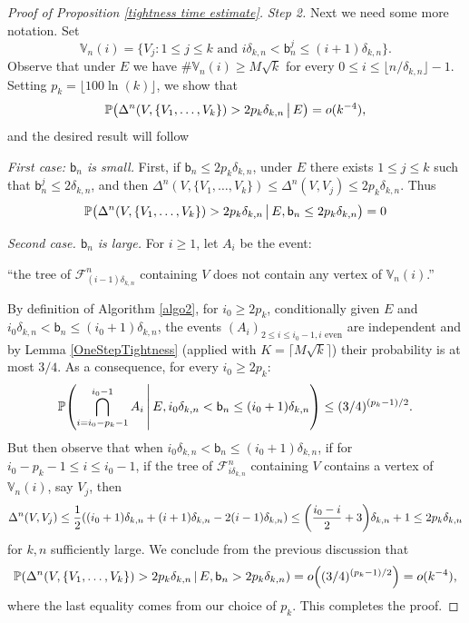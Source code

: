 \documentclass[11pt]{article}
\theoremstyle{plain}
\theoremstyle{definition}
\theoremstyle{remark}
\newcommand{\1}{\mathbbm{1}} %
\newcommand{\proba}[1]{\mathbb{P}\left(#1\right)} %
\newcommand{\F}{\mathcal{F}} %
\newcommand{\birth}{\mathsf{b}} %
\let\originalleft\left
\let\originalright\right
\renewcommand{\left}{\mathopen{}\mathclose\bgroup\originalleft}
\renewcommand{\right}{\aftergroup\egroup\originalright}
\begin{document}
\begin{proof}[Proof of Proposition \ref{tightness time estimate}]
\emph{Step 2.} Next we need some more notation. Set
\[
\mathbb{V}_{n}(i)= \{V_{j} : 1 \leq j \leq k \textrm{ and } i \delta_{k,n} {<} \birth_{n}^{j} {\leq} (i+1) \delta_{k,n} \}.
\]
Observe that under $E$ we have $\#\mathbb{V}_{n}(i) \geq M \sqrt{k}$ for every $0 \leq i \leq \lfloor n/ \delta_{k,n} \rfloor -1$.   Setting $p_{k}={\lfloor 100 \ln(k)\rfloor}$, we show that
\begin{equation}
\label{eq:tocheck}\proba{\Delta^n(V,\{V_1,\dots, V_{k}\})> 2p_{k} \delta_{k,n} \, \big |  \, E} = o(k^{-4}),
\end{equation}
and the desired result will follow

\emph{First case: $\birth_{n}$ is small.} First, if $\birth_{n} \leq 2p_{k}  \delta_{k,n}$, under $E$ there exists $1 \leq j \leq k$ such that $\birth^{j}_{n} \leq 2 \delta_{k,n}$, and then $\Delta^n(V,\{V_1,\dots, V_{k}\}) \leq \Delta^{n}(V,V_{j}) \leq 2 p_{k}\delta_{k,n}$. Thus
\[
\proba{\Delta^n(V,\{V_1,\dots, V_{k}\})> 2p_{k} \delta_{k,n} \, \big |  \, E, \birth_{n} \leq 2 p_{k} \delta_{k,n}} = 0
\]

 

\emph{Second case. $\birth_{n}$ is large.}  
For $i \geq 1$, let $A_{i}$ be the event:
\begin{center}
``the tree of $\F^n _{ {(i-1)} \delta_{k,n} }$ containing $V$ does not contain any vertex of $\mathbb{V}_{n}(i)$.''
\end{center}
By definition of Algorithm \ref{algo2}, for $i_{0} \geq 2 p_{k}$, conditionally given  $E$ and $i_{0} \delta _{k,n} < \birth_{n} \leq (i_{0}+1) \delta_{k,n}$, the events $(A_{i})_{2 \leq i \leq i_{0}-1, {i \text{ even}}}$ are independent and by Lemma \ref{OneStepTightness} (applied with $K= \lceil M \sqrt{k} \rceil$) their probability is at most $3/4$.  As a consequence, for every $i_{0} \geq 2 p_{k}$:
\[
\proba{ \bigcap_{i=i_{0}-p_{k}-1}^{i_{0}-1} A_{i} \, \middle | \,  E, i_{0} \delta _{k,n} < \birth_{n}  \leq (i_{0}+1) \delta_{k,n}} \leq  (3/4)^{{(p_{k}-1)/2}}.
\]
But then observe that when $i_{0} \delta _{k,n} < \birth_{n} \leq (i_{0}+1) \delta_{k,n}$, if for $i_{0}-p_{k}-1 \leq i \leq i_{0}-1$,  if the tree of $\F^n _{ i \delta_{k,n} }$ containing $V$  contains a vertex of $\mathbb{V}_{n}(i)$, say $V_{j}$, then
\[
\Delta^{n}(V,V_{j}) \leq  \frac{1}{2}  \left( (i_{0}+1) \delta_{k,n}+(i+1) \delta_{k,n}- 2 (i-1) \delta _{k,n} \right) \leq  \left(  \frac{i_{0}-i}{2}  +3 \right)\delta _{k,n}+1 \leq  2 p_{k} \delta_{k,n}
\]
for $k,n$ sufficiently large. We conclude from the previous discussion that
\[
\proba{\Delta^n(V,\{V_1,\dots, V_{k}\})> 2p_{k} \delta_{k,n} \, \middle |  \, E, \birth_{n} > 2 p_{k} \delta_{k,n}} = o  \left( (3/4)^{{(p_{k}-1)/2}} \right)=o(k^{-4}),
\]
where the last equality comes from our choice of $p_{k}$. This completes the proof.
\end{proof}
\end{document}
